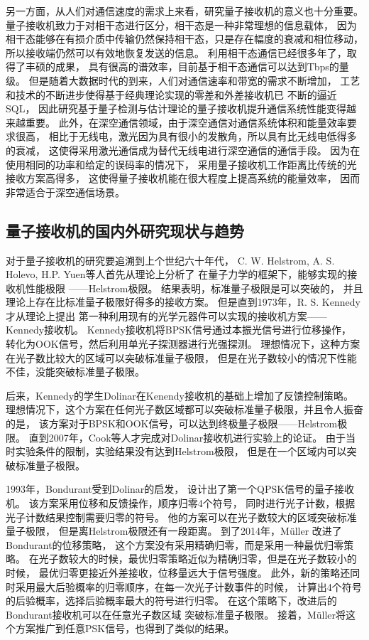 另一方面，从人们对通信速度的需求上来看，研究量子接收机的意义也十分重要。
量子接收机致力于对相干态进行区分，相干态是一种非常理想的信息载体，
因为相干态能够在有损介质中传输仍然保持相干态，只是存在幅度的衰减和相位移动，
所以接收端仍然可以有效地恢复发送的信息。
利用相干态通信已经很多年了，取得了丰硕的成果，
具有很高的谱效率，目前基于相干态通信可以达到Tbps的量级\cite{jinno2007networks}。
但是随着大数据时代的到来，人们对通信速率和带宽的需求不断增加，
工艺和技术的不断进步使得基于经典理论实现的零差和外差接收机已
不断的逼近SQL\cite{tsukamoto2006unrepeated}，
因此研究基于量子检测与估计理论的量子接收机提升通信系统性能变得越来越重要。
此外，在深空通信领域，由于深空通信对通信系统体积和能量效率要求很高，
相比于无线电，激光因为具有很小的发散角，所以具有比无线电低得多的衰减，
这使得采用激光通信成为替代无线电进行深空通信的通信手段\cite{hemmati2006deep}。
因为在使用相同的功率和给定的误码率的情况下，
采用量子接收机工作距离比传统的光接收方案高得多\cite{helstrom1976quantum}，
这使得量子接收机能在很大程度上提高系统的能量效率，
因而非常适合于深空通信场景。



\subsection{量子接收机的国内外研究现状与趋势}
对于量子接收机的研究要追溯到上个世纪六十年代，
C. W. Helstrom, A. S. Holevo, H.P. Yuen等人首先从理论上分析了
在量子力学的框架下，能够实现的接收机性能极限
——Helstrom极限\cite{helstrom1976quantum,helstrom1967detection,yuen1970optimal,
yuen1975optimum,eldar2003designing}。
结果表明，标准量子极限是可以突破的，
并且理论上存在比标准量子极限好得多的接收方案。
但是直到1973年，R. S. Kennedy才从理论上提出
第一种利用现有的光学元器件可以实现的接收机方案——Kennedy接收机\cite{kennedy1973near}。
Kennedy接收机将BPSK信号通过本振光信号进行位移操作，
转化为OOK信号，然后利用单光子探测器进行光强探测。
理想情况下，这种方案在光子数比较大的区域可以突破标准量子极限，
但是在光子数较小的情况下性能不佳，没能突破标准量子极限。

后来，Kennedy的学生Dolinar在Kenendy接收机的基础上增加了反馈控制策略\cite{dolinar1973optimum}。
理想情况下，这个方案在任何光子数区域都可以突破标准量子极限，并且令人振奋的是，
该方案对于BPSK和OOK信号，可以达到终极量子极限——Helstrom极限。
直到2007年，Cook等人才完成对Dolinar接收机进行实验上的论证\cite{cook2007optical}。
由于当时实验条件的限制，实验结果没有达到Helstrom极限，
但是在一个区域内可以突破标准量子极限。

1993年，Bondurant受到Dolinar的启发，
设计出了第一个QPSK信号的量子接收机\cite{bondurant1993near}。
该方案采用位移和反馈操作，顺序归零4个符号，
同时进行光子计数，根据光子计数结果控制需要归零的符号。
他的方案可以在光子数较大的区域突破标准量子极限，
但是离Helstrom极限还有一段距离。
到了2014年，Müller 改进了Bondurant的位移策略，
这个方案没有采用精确归零，而是采用一种最优归零策略。
在光子数较大的时候，最优归零策略近似为精确归零，但是在光子数较小的时候，
最优归零更接近外差接收，位移量远大于信号强度。
此外，新的策略还同时采用最大后验概率的归零顺序，在每一次光子计数事件的时候，
计算出4个符号的后验概率，选择后验概率最大的符号进行归零。
在这个策略下，改进后的Bondurant接收机可以在任意光子数区域
突破标准量子极限\cite{muller2014qpsk}。
接着，Müller将这个方案推广到任意PSK信号，也得到了类似的结果\cite{muller2014m}。

